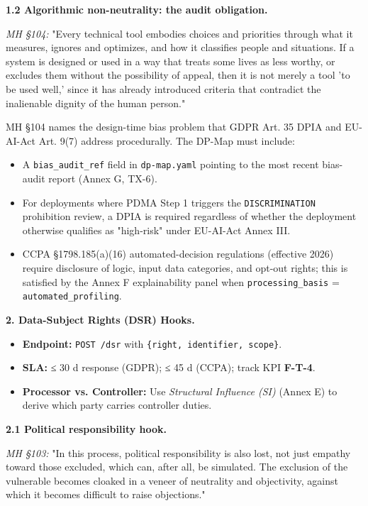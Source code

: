 \documentclass[11pt]{article}
\begin{document}
\textbf{1.2 Algorithmic non-neutrality: the audit obligation.}


\textit{MH §104:} "Every technical tool embodies choices and priorities through what it measures, ignores and optimizes, and how it classifies people and situations. If a system is designed or used in a way that treats some lives as less worthy, or excludes them without the possibility of appeal, then it is not merely a tool 'to be used well,' since it has already introduced criteria that contradict the inalienable dignity of the human person."


MH §104 names the design-time bias problem that GDPR Art. 35 DPIA and EU-AI-Act Art. 9(7) address procedurally. The DP-Map must include:


\begin{itemize}\setlength\itemsep{0pt}
\item A \texttt{bias\_audit\_ref} field in \texttt{dp-map.yaml} pointing to the most recent bias-audit report (Annex G, TX-6).
\item For deployments where PDMA Step 1 triggers the \texttt{DISCRIMINATION} prohibition review, a DPIA is required regardless of whether the deployment otherwise qualifies as "high-risk" under EU-AI-Act Annex III.
\item CCPA §1798.185(a)(16) automated-decision regulations (effective 2026) require disclosure of logic, input data categories, and opt-out rights; this is satisfied by the Annex F explainability panel when \texttt{processing\_basis} = \texttt{automated\_profiling}.
\end{itemize}


\textbf{2. Data-Subject Rights (DSR) Hooks.}


\begin{itemize}\setlength\itemsep{0pt}
\item \textbf{Endpoint:} \texttt{POST /dsr} with \texttt{\{right, identifier, scope\}}.
\item \textbf{SLA:} ≤ 30 d response (GDPR); ≤ 45 d (CCPA); track KPI \textbf{F-T-4}.
\item \textbf{Processor vs. Controller:} Use \textit{Structural Influence (SI)} (Annex E) to derive which party carries controller duties.
\end{itemize}


\textbf{2.1 Political responsibility hook.}


\textit{MH §103:} "In this process, political responsibility is also lost, not just empathy toward those excluded, which can, after all, be simulated. The exclusion of the vulnerable becomes cloaked in a veneer of neutrality and objectivity, against which it becomes difficult to raise objections."
\end{document}
